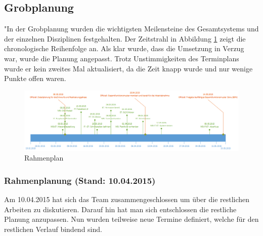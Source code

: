 \subsection{Grobplanung}"In der Grobplanung wurden die wichtigsten Meilensteine des Gesamtsystems und der einzelnen Disziplinen festgehalten.
Der Zeitstrahl in Abbildung \ref{fig:rahmenplanung} zeigt die chronologische Reihenfolge an. Als klar wurde, dass die Umsetzung in Verzug war, wurde die Planung angepasst.
Trotz Unstimmigkeiten des Terminplans wurde er kein zweites Mal aktualisiert, da die Zeit knapp wurde und nur wenige Punkte offen waren.

\begin{landscape}
	\begin{figure}
		\centering
		\includegraphics[width=1\linewidth]{../../fig/rahmenplanung}
		\caption{Rahmenplan}
		\label{fig:rahmenplanung}
	\end{figure}
\end{landscape}

\subsubsection{Rahmenplanung (Stand: 10.04.2015)}

Am 10.04.2015 hat sich das Team zusammengeschlossen um über die restlichen Arbeiten zu diskutieren. Darauf hin hat man sich entschlossen die restliche Planung anzupassen. Nun wurden teilweise neue Termine definiert, welche für den restlichen Verlauf bindend sind.

